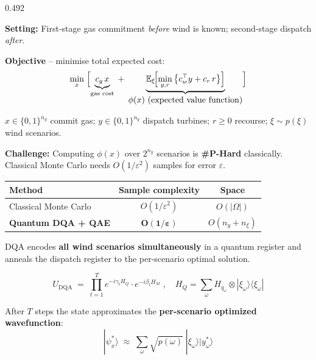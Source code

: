 \documentclass[final]{beamer}
\newcommand{\theoryblock}[2]{%
  \begin{tcolorbox}[
      enhanced, arc=6pt, boxrule=2pt,
      colback=lightblue, colframe=accentblue,
      colbacktitle=accentblue, coltitle=white,
      fonttitle=\bfseries\large, title={#1},
      top=6pt, bottom=6pt, left=9pt, right=9pt,
      before skip=10pt, after skip=0pt,
  ]#2\end{tcolorbox}}
\begin{document}
\begin{frame}[t]{}
\begin{columns}[T,totalwidth=\linewidth]
\begin{column}{0.492\linewidth}
{\textbf{Setting:} First-stage gas commitment \emph{before} wind is known;
second-stage dispatch \emph{after}.

\vspace{0.3cm}
\textbf{Objective} -- minimise total expected cost:
\[
  \min_{x}\;\Bigl[\underbrace{c_g\,x}_{\text{gas cost}}
  \;+\;
  \underbrace{\mathbb{E}_{\xi}\!\Bigl[\min_{y,r}\,\bigl\{c_w^\top y + c_r\,r\bigr\}\Bigr]}_{\displaystyle\phi(x)\ \text{(expected value function)}}\Bigr]
\]

$x\!\in\!\{0,1\}^{n_g}$ commit gas; $y\!\in\!\{0,1\}^{n_y}$ dispatch turbines;
$r\!\ge\!0$ recourse; $\xi\sim p(\xi)$ wind scenarios.

\vspace{0.3cm}
\textbf{Challenge:} Computing $\phi(x)$ over $2^{n_y}$ scenarios is
\textbf{\#P-Hard} classically. Classical Monte Carlo needs $O(1/\varepsilon^2)$
samples for error $\varepsilon$.

\vspace{0.3cm}
\begin{center}
\begin{tabular}{lcc}
  \toprule
  \textbf{Method} & \textbf{Sample complexity} & \textbf{Space} \\
  \midrule
  Classical Monte Carlo & $O(1/\varepsilon^2)$ & $O(|\Omega|)$ \\
  \textbf{Quantum DQA + QAE} & $\boldsymbol{O(1/\varepsilon)}$ & $O(n_y + n_\xi)$ \\
  \bottomrule
\end{tabular}
\end{center}
}

\vspace{0.15cm}

\theoryblock{2 \quad Digitized Quantum Annealing (DQA)}{

DQA encodes \textbf{all wind scenarios simultaneously} in a quantum register and
anneals the dispatch register to the per-scenario optimal solution.

\[
  U_\text{DQA} \;=\; \prod_{t=1}^{T}
    e^{-i\gamma_t H_Q}
    \cdot
    e^{-i\beta_t H_M}
    \;,\quad
  H_Q = \sum_\omega H_{q_\omega} \otimes |\xi_\omega\rangle\langle\xi_\omega|
\]

After $T$ steps the state approximates the \textbf{per-scenario optimized wavefunction}:
\[
  |\psi_x^*\rangle \;\approx\;
  \sum_\omega \sqrt{p(\omega)}\;|\xi_\omega\rangle|y_\omega^*\rangle
\]

}
\end{column}
\end{columns}
\end{frame}
\end{document}

